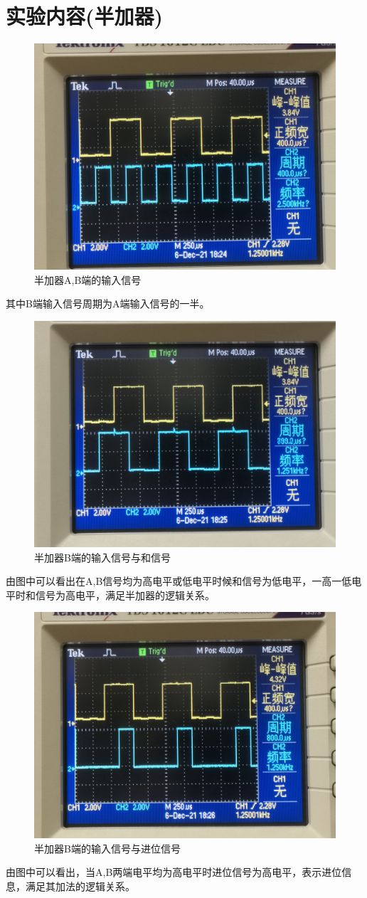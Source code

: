\documentclass[a4 paper,12pt]{article}
\begin{document}
	\section{实验内容(半加器)}
    \noindent
	\begin{figure}[H]
		\centering
		\hspace{2em}\includegraphics[width=.4\linewidth]{pic/1.jpg}
		\caption{半加器A,B端的输入信号
		}
	\end{figure}
    \par 其中B端输入信号周期为A端输入信号的一半。
	\begin{figure}[H]
		\centering
		\hspace{2em}\includegraphics[width=.4\linewidth]{pic/2.jpg}
		\caption{半加器B端的输入信号与和信号
		}
	\end{figure}
    \par 由图中可以看出在A,B信号均为高电平或低电平时候和信号为低电平，一高一低电平时和信号为高电平，满足半加器的逻辑关系。
    \begin{figure}[H]
    		\centering
    		\hspace{2em}\includegraphics[width=.4\linewidth]{pic/3.jpg}
    		\caption{半加器B端的输入信号与进位信号
    		}
    	\end{figure}
        \par 由图中可以看出，当A,B两端电平均为高电平时进位信号为高电平，表示进位信息，满足其加法的逻辑关系。
\end{document}
